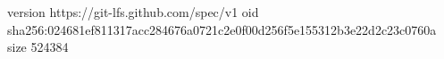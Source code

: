 version https://git-lfs.github.com/spec/v1
oid sha256:024681ef811317acc284676a0721c2e0f00d256f5e155312b3e22d2c23c0760a
size 524384
